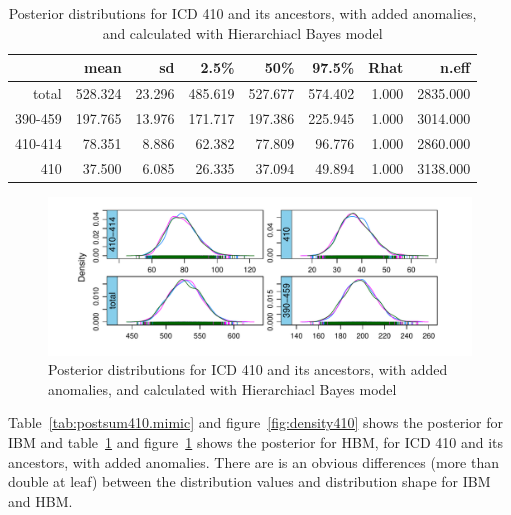 \newpage%

\begin{table}[!t]
	\centering
	\begin{tabular}{rrrrrrrr}
		\hline
		& mean & sd & 2.5\% & 50\% & 97.5\% & Rhat & n.eff \\ 
		\hline
		total & 528.324 & 23.296 & 485.619 & 527.677 & 574.402 & 1.000 & 2835.000 \\ 
		390-459 & 197.765 & 13.976 & 171.717 & 197.386 & 225.945 & 1.000 & 3014.000 \\ 
		410-414 & 78.351 & 8.886 & 62.382 & 77.809 & 96.776 & 1.000 & 2860.000 \\ 
		410 & 37.500 & 6.085 & 26.335 & 37.094 & 49.894 & 1.000 & 3138.000 \\ 
		\hline
	\end{tabular}
	\caption{Posterior distributions for ICD 410 and its ancestors, with added anomalies, and calculated with Hierarchiacl Bayes model} 
	\label{tab:postsum410h.mimic}
\end{table}

\begin{figure}[!h]
	\centering
	\includegraphics[width=1\linewidth]{../../R-codes/JAGS/plots/mimic/Density410h}
	\caption{Posterior distributions for ICD 410 and its ancestors, with added anomalies, and calculated with Hierarchiacl Bayes model}
	\label{fig:density410h}
\end{figure}

Table~\ref{tab:postsum410.mimic} and figure~\ref{fig:density410} shows the posterior for IBM and table~\ref{tab:postsum410h.mimic} and figure~\ref{fig:density410h} shows the posterior for HBM, for ICD 410 and its ancestors, with added anomalies. There are is an obvious differences (more than double at leaf) between the distribution values and distribution shape for IBM and HBM. 

\newpage%

